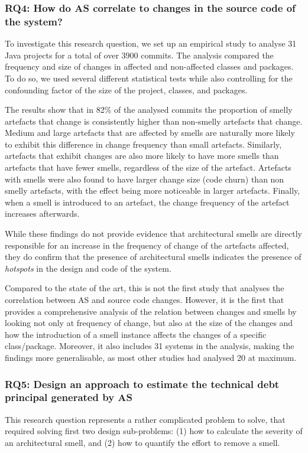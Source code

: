 \subsubsection*{RQ4: How do AS correlate to changes in the source code of the system?}
To investigate this research question, we set up an empirical study to analyse 31 Java projects for a total of over 3900 commits.
The analysis compared the frequency and size of changes in affected and non-affected classes and packages.
To do so, we used several different statistical tests while also controlling for the confounding factor of the size of the project, classes, and packages.

The results show that in 82\% of the analysed commits the proportion of smelly artefacts that change is consistently higher than non-smelly artefacts that change.
Medium and large artefacts that are affected by smells are naturally more likely to exhibit this difference in change frequency than small artefacts.
Similarly, artefacts that exhibit changes are also more likely to have more smells than artefacts that have fewer smells, regardless of the size of the artefact.
Artefacts with smells were also found to have larger change size (code churn) than non smelly artefacts, with the effect being more noticeable in larger artefacts.
Finally, when a smell is introduced to an artefact, the change frequency of the artefact increases afterwards.

While these findings do not provide evidence that architectural smells are directly responsible for an increase in the frequency of change of the artefacts affected, they do confirm that the presence of architectural smells indicates the presence of \emph{hotspots} in the design and code of the system.

Compared to the state of the art, this is not the first study that analyses the correlation between AS and source code changes. However, it is the first that provides a comprehensive analysis of the relation between changes and smells by looking not only at frequency of change, but also at the size of the changes and how the introduction of a smell instance affects the changes of a specific class/package.
Moreover, it also includes 31 systems in the analysis, making the findings more generalisable, as most other studies had analysed 20 at maximum.

\subsubsection*{RQ5: Design an approach to estimate the technical debt principal generated by AS}
This research question represents a rather complicated problem to solve, that required solving first two design sub-problems: (1) how to calculate the severity of an architectural smell, and (2) how to quantify the effort to remove a smell.

